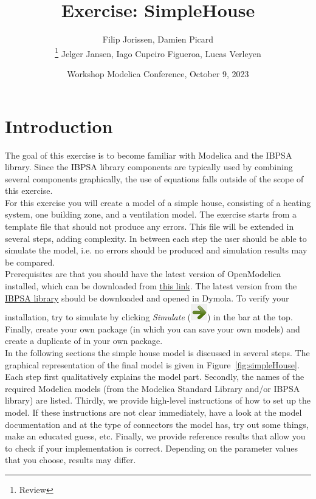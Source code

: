 \documentclass[10pt,a4paper]{article}
\begin{document}
\title{Exercise: SimpleHouse}
\author{Filip Jorissen, Damien Picard\\ \thanks{Review} Jelger Jansen, Iago Cupeiro Figueroa, Lucas Verleyen}
\date{Workshop Modelica Conference, October 9, 2023}
\maketitle


\doclicenseThis


\section*{Introduction}
The goal of this exercise is to become familiar with Modelica and the IBPSA library. Since the IBPSA library components are typically used by combining several components graphically, the use of equations falls outside of the scope of this exercise.\\

For this exercise you will create a model of a simple house, consisting of a heating system, one building zone, and a ventilation model. The exercise starts from a template file that should not produce any errors. This file will be extended in several steps, adding complexity. In between each step the user should be able to simulate the model, i.e. no errors should be produced and simulation results may be compared.\\

Prerequisites are that you should have the latest version of OpenModelica installed, which can be downloaded from \href{https://openmodelica.org/}{this link}. The latest version from the \href{https://github.com/ibpsa/modelica-ibpsa}{IBPSA library} should be downloaded and opened in Dymola. To verify your installation, try to simulate  by clicking \textit{Simulate} (\includegraphics[scale=0.35]{simulate.png}) in the bar at the top. Finally, create your own package (in which you can save your own models) and create a duplicate of  in your own package.\\

In the following sections the simple house model is discussed in several steps. The graphical representation of the final model is given in Figure~\ref{fig:simpleHouse}. Each step first qualitatively explains the model part. Secondly, the names of the required Modelica models (from the Modelica Standard Library and/or IBPSA library) are listed. Thirdly, we provide high-level instructions of how to set up the model. If these instructions are not clear immediately, have a look at the model documentation and at the type of connectors the model has, try out some things, make an educated guess, etc. Finally, we provide reference results that allow you to check if your implementation is correct. Depending on the parameter values that you choose, results may differ.\\
\end{document}

